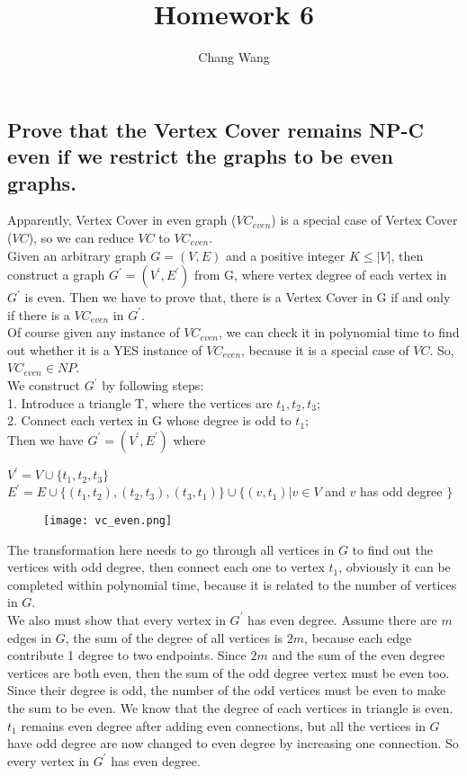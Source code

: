 \documentclass[12pt]{report}
\title{Homework 6}
\author{Chang Wang}
\begin{document}
\maketitle

\subsection{Prove that the Vertex Cover remains NP-C even if we restrict the graphs to be even graphs.}

Apparently, Vertex Cover in even graph ($VC_{even}$) is a special case of Vertex Cover ($VC$), so we can reduce $VC$ to $VC_{even}$. \\
Given an arbitrary graph $G=(V,E)$ and a positive integer $K \le |V|$, then construct a graph $G^{'} = (V^{'}, E^{'})$ from G, where vertex degree of each vertex in $G^{'}$ is even. Then we have to prove that, there is a Vertex Cover in G if and only if there is a $VC_{even}$ in $G^{'}$. \\
Of course given any instance of $VC_{even}$, we can check it in polynomial time to find out whether it is a YES instance of $VC_{even}$, because it is a special case of $VC$. So, $VC_{even} \in NP$.\\
We construct $G^{'}$ by following steps: \\
1. Introduce a triangle T, where the vertices are $t_{1}, t_{2}, t_{3}$; \\
2. Connect each vertex in G whose degree is odd to $t_{1}$; \\
Then we have $G^{'} = (V^{'}, E^{'})$ where
\begin{center}
$V^{'} = V \cup \{ t_{1}, t_{2}, t_{3} \}$ \\
$E^{'} = E \cup \{ (t_{1},t_{2}), (t_{2},t_{3}),(t_{3},t_{1}) \} \cup \{ (v,t_{1}) | v \in V$ and $v$ has odd degree $\}$
\end{center}
\begin{figure}[hb]
\begin{center}
\texttt{[image: vc\_even.png]}
\end{center}
\end{figure}
The transformation here needs to go through all vertices in $G$ to find out the vertices with odd degree, then connect each one to vertex $t_{1}$, obviously it can be completed within polynomial time, because it is related to the number of vertices in $G$. \\
We also must show that every vertex in $G^{'}$ has even degree. Assume there are $m$ edges in $G$, the sum of the degree of all vertices is $2m$, because each edge contribute 1 degree to two endpoints. Since $2m$ and the sum of the even degree vertices are both even, then the sum of the odd degree vertex must be even too. Since their degree is odd, the number of the odd vertices must be even to make the sum to be even. We know that the degree of each vertices in triangle is even. $t_{1}$ remains even degree after adding even connections, but all the vertices in $G$ have odd degree are now changed to even degree by increasing one connection. So every vertex in $G^{'}$ has even degree.\\
\end{document}
